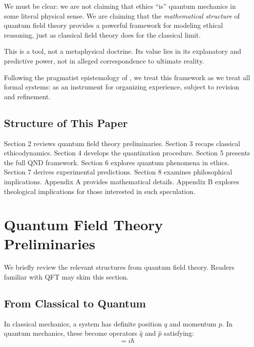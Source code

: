 \documentclass[12pt]{article}
\begin{document}
We must be clear: we are not claiming that ethics ``is'' quantum mechanics in some literal physical sense. We are claiming that the \emph{mathematical structure} of quantum field theory provides a powerful framework for modeling ethical reasoning, just as classical field theory does for the classical limit.

This is a tool, not a metaphysical doctrine. Its value lies in its explanatory and predictive power, not in alleged correspondence to ultimate reality.

Following the pragmatist epistemology of \cite{bond2025pragmatist}, we treat this framework as we treat all formal systems: as an instrument for organizing experience, subject to revision and refinement.

\subsection{Structure of This Paper}

Section 2 reviews quantum field theory preliminaries. Section 3 recaps classical ethicodynamics. Section 4 develops the quantization procedure. Section 5 presents the full QND framework. Section 6 explores quantum phenomena in ethics. Section 7 derives experimental predictions. Section 8 examines philosophical implications. Appendix A provides mathematical details. Appendix B explores theological implications for those interested in such speculation.

\section{Quantum Field Theory Preliminaries}

We briefly review the relevant structures from quantum field theory. Readers familiar with QFT may skim this section.

\subsection{From Classical to Quantum}

In classical mechanics, a system has definite position $q$ and momentum $p$. In quantum mechanics, these become operators $\hat{q}$ and $\hat{p}$ satisfying:
\begin{equation}
    [\hat{q}, \hat{p}] = i\hbar
\end{equation}
\end{document}
